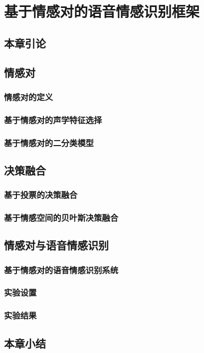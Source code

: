 \chapter{基于情感对的语音情感识别框架}
\label{cha:emotion_pair_base_framework}

\section{本章引论}

\section{情感对}

\subsection{情感对的定义}

\subsection{基于情感对的声学特征选择}

\subsection{基于情感对的二分类模型}

\section{决策融合}

\subsection{基于投票的决策融合}

\subsection{基于情感空间的贝叶斯决策融合}

\section{情感对与语音情感识别}

\subsection{基于情感对的语音情感识别系统}

\subsection{实验设置}

\subsection{实验结果}

\section{本章小结}